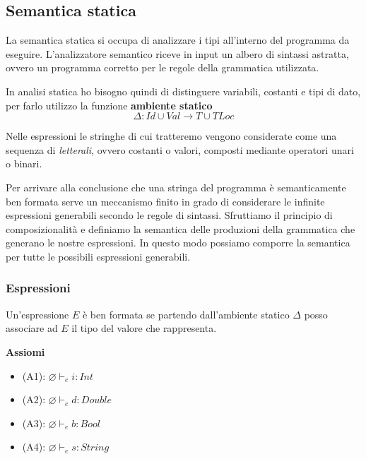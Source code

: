 \documentclass{article}
\begin{document}
\pagebreak

\subsection{Semantica statica}
La semantica statica si occupa di analizzare i tipi all'interno del programma da eseguire. L'analiz\-zatore semantico riceve in input un albero di sintassi astratta, ovvero un programma corretto per le regole della grammatica utilizzata.

In analisi statica ho bisogno quindi di distinguere variabili, costanti e tipi di dato, per farlo utilizzo la funzione \textbf{ambiente statico}
\[\Delta: Id \cup Val \rightarrow T \cup TLoc\]

Nelle espressioni le stringhe di cui tratteremo vengono considerate come una sequenza di \emph{letterali}, ovvero costanti o valori, composti mediante operatori unari o binari.

Per arrivare alla conclusione che una stringa del programma è semanticamente ben formata serve un meccanismo finito in grado di considerare le infinite espressioni generabili secondo le regole di sintassi. Sfruttiamo il principio di composizionalità e definiamo la semantica delle produzioni della grammatica che generano le nostre espressioni. In questo modo possiamo comporre la semantica per tutte le possibili espressioni generabili.

\subsubsection{Espressioni}
Un'espressione \(E\) è ben formata se partendo dall'ambiente statico \(\Delta\) posso associare ad \(E\) il tipo del valore che rappresenta.

\vspace{.2cm}

\noindent\textbf{Assiomi}
\begin{itemize}
    \item (A1): \(\varnothing \vdash_e i : Int\)
    \item (A2): \(\varnothing \vdash_e d : Double\)
    \item (A3): \(\varnothing \vdash_e b : Bool\)
    \item (A4): \(\varnothing \vdash_e s : String\)
\end{itemize}
\end{document}
